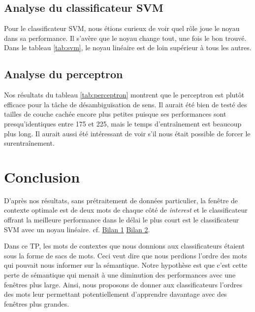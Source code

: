 \documentclass[11pt]{rapport-tp-ia}
\begin{document}
\section{Analyse du classificateur SVM}
Pour le classificateur SVM, nous étions curieux de voir quel rôle joue le noyau dans sa performance.
Il s'avère que le noyau change tout, une fois le bon trouvé.
Dans le tableau \ref{tab:svm}, le noyau linéaire est de loin supérieur à tous les autres.

\section{Analyse du perceptron}
Nos résultats du tableau \ref{tab:perceptron} montrent que le perceptron est plutôt efficace pour la tâche de désambiguïsation de sens.
Il aurait été bien de testé des tailles de couche cachée encore plus petites puisque ses performances sont presqu'identiques entre 175 et 225, mais le temps d'entraînement est beaucoup plus long.
Il aurait aussi été intéressant de voir s'il nous était possible de forcer le surentraînement.

\vspace{3em}
\newpage %
\chapter{Conclusion}
D'après nos résultats, sans prétraitement de données particulier, la fenêtre de contexte optimale est de deux mots de chaque côté de \textit{interest} et le classificateur offrant la meilleure performance dans le délai le plus court est le classificateur SVM avec un noyau linéaire. cf. \hyperref[fig:bilanwindow]{Bilan 1}
\hyperref[fig:bilanparams]{Bilan 2}.

Dans ce TP, les mots de contextes que nous donnions aux classificateurs étaient sous la forme de sacs de mots.
Ceci veut dire que nous perdions l'ordre des mots qui pouvait nous informer sur la sémantique.
Notre hypothèse est que c'est cette perte de sémantique qui menait à une diminution des performances avec une fenêtres plus large.
Ainsi, nous proposons de donner aux classificateurs l'ordres des mots leur permettant potentiellement d'apprendre davantage avec des fenêtres plus grandes.

\newpage
\end{document}

